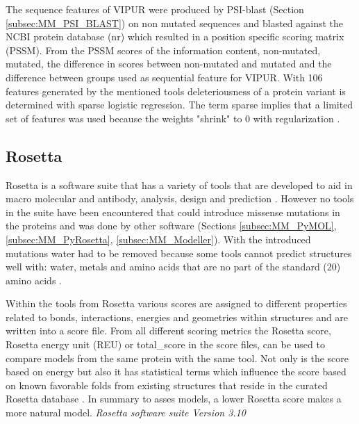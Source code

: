The sequence features of VIPUR were produced by PSI-blast (Section \ref{subsec:MM_PSI_BLAST}) on non mutated sequences and blasted against the NCBI protein database (nr) which resulted in a position specific scoring matrix (PSSM). 
From the PSSM scores of the information content, non-mutated, mutated, the difference in scores between non-mutated and mutated and the difference between groups \cite{baugh_robust_2016, poultney_rational_2011} used as sequential feature for VIPUR.
With 106 features generated by the mentioned tools deleteriousness of a protein variant is determined with sparse logistic regression. The term sparse implies that a limited set of features was used because the weights "shrink" to 0 with regularization \cite{baugh_supplementary:_2016}.
\label{subsec:MM_VIPUR}

\subsection{Rosetta}
Rosetta is a software suite that has a variety of tools that are developed to aid in macro molecular and antibody, analysis, design and prediction \cite{rosetta_commons_about_nodate}.
However no tools in the suite have been encountered that could introduce missense mutations in the proteins and was done by other software (Sections \ref{subsec:MM_PyMOL}, \ref{subsec:MM_PyRosetta}, \ref{subsec:MM_Modeller}). With the introduced mutations water had to be removed because some tools cannot predict structures well with: water, metals and amino acids that are no part of the standard (20) amino acids \cite{rosetta_commons_how_nodate}.

Within the tools from Rosetta various scores are assigned to different properties related to bonds, interactions, energies and geometries within structures and are written into a score file. 
From all different scoring metrics the Rosetta score, Rosetta energy unit (REU) or total\_score in the score files, can be used to compare models from the same protein with the same tool. 
Not only is the score based on energy but also it has statistical terms which influence the score based on known favorable folds from existing structures that reside in the curated Rosetta database \cite{shourya_scoring_nodate}. 
In summary to asses models, a lower Rosetta score makes a more natural model.
\label{subsec:MM_Rosetta}
\newline
\textit{Rosetta software suite Version 3.10}

